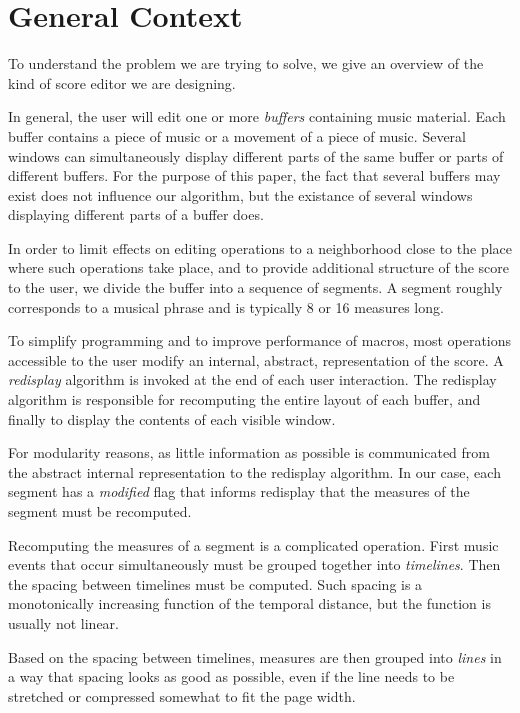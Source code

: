 \documentclass{article}
\begin{document}
\section{General Context}

To understand the problem we are trying to solve, we give an overview
of the kind of score editor we are designing.  

In general, the user will edit one or more \emph{buffers} containing
music material.  Each buffer contains a piece of music or a movement
of a piece of music.  Several windows can simultaneously display
different parts of the same buffer or parts of different buffers.  For
the purpose of this paper, the fact that several buffers may exist
does not influence our algorithm, but the existance of several windows
displaying different parts of a buffer does. 

In order to limit effects on editing operations to a neighborhood
close to the place where such operations take place, and to provide
additional structure of the score to the user, we divide the buffer
into a sequence of segments.  A segment roughly corresponds to a
musical phrase and is typically 8 or 16 measures long.

To simplify programming and to improve performance of macros, most
operations accessible to the user modify an internal, abstract,
representation of the score.  A \emph{redisplay} algorithm is invoked
at the end of each user interaction.  The redisplay algorithm is
responsible for recomputing the entire layout of each buffer, and
finally to display the contents of each visible window. 

For modularity reasons, as little information as possible is
communicated from the abstract internal representation to the
redisplay algorithm.  In our case, each segment has a \emph{modified}
flag that informs redisplay that the measures of the segment must be
recomputed.  

Recomputing the measures of a segment is a complicated operation.
First music events that occur simultaneously must be grouped together
into \emph{timelines}.  Then the spacing between timelines must be
computed.  Such spacing is a monotonically increasing function of the
temporal distance, but the function is usually not linear. 

Based on the spacing between timelines, measures are then grouped into
\emph{lines} in a way that spacing looks as good as possible, even if
the line needs to be stretched or compressed somewhat to fit the page
width. 
\end{document}
